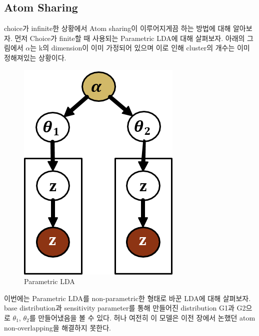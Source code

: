 \documentclass[a4paper]{oblivoir}
\begin{document}
\subsection{Atom Sharing}
choice가 infinite한 상황에서 Atom sharing이 이루어지게끔 하는 방법에 대해 알아보자. 먼저 Choice가 finite할 때 사용되는 Parametric LDA에 대해 살펴보자. 아래의 그림에서 $\alpha$는 k의 dimension이 이미 가정되어 있으며 이로 인해 cluster의 개수는 이미 정해져있는 상황이다.
\begin{figure}[ht] \centering 
\begin{center}
\includegraphics[scale=0.6]{fig13_11.png} 
\caption{Parametric LDA}
\label{fig:13-13}
\end{center}
\end{figure}
이번에는 Parametric LDA를 non-parametric한 형태로 바꾼 LDA에 대해 살펴보자. base distribution과 sensitivity parameter를 통해 만들어진 distribution G1과 G2으로 $\theta_{1}$, $\theta_{2}$를 만들어냈음을 볼 수 있다. 허나 여전히 이 모델은 이전 장에서 논했던 atom non-overlapping을 해결하지 못한다. 
\end{document}
